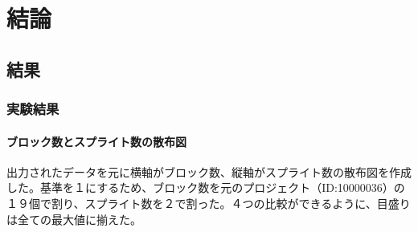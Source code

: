 \documentclass[a4paper,10pt,onecolumn,oneside,openany]{jsbook}
\begin{document}
\part{結論}
\chapter{結果}
\section{実験結果}

\subsection{ブロック数とスプライト数の散布図}
出力されたデータを元に横軸がブロック数、縦軸がスプライト数の散布図を作成した。基準を１にするため、ブロック数を元のプロジェクト（ID:10000036）の１９個で割り、スプライト数を２で割った。４つの比較ができるように、目盛りは全ての最大値に揃えた。
\end{document}
